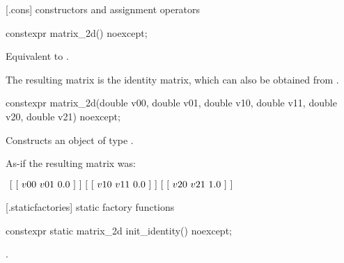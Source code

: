  [\matrixtwod.cons] { constructors and assignment operators}

\begin{itemdecl}
constexpr matrix_2d() noexcept;
\end{itemdecl}
\begin{itemdescr}
\pnum
\effects
Equivalent to .

\pnum
\realnote
The resulting matrix is the identity matrix, which can also be obtained from .
\end{itemdescr}

\begin{itemdecl}
constexpr matrix_2d(double v00, double v01, double v10, double v11,
  double v20, double v21) noexcept;
\end{itemdecl}
\begin{itemdescr}
\pnum
\effects
Constructs an object of type .

\pnum
As-if the resulting matrix was:

$\\
~[~[~v00~v01~0.0~]~] \\
~[~[~v10~v11~0.0~]~] \\
~[~[~v20~v21~1.0~]~]$ \\

%
%
%
%
%
\end{itemdescr}

 [\matrixtwod.staticfactories] { static factory 
functions}

\begin{itemdecl}
constexpr static matrix_2d init_identity() noexcept;
\end{itemdecl}
\begin{itemdescr}
\pnum
\returns
{}.
\end{itemdescr}

